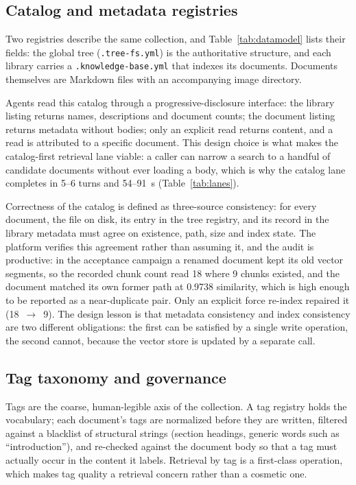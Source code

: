 \subsection{Catalog and metadata registries}
\label{sec:org-registries}

Two registries describe the same collection, and Table~\ref{tab:datamodel}
lists their fields: the global tree (\texttt{.tree-fs.yml}) is the
authoritative structure, and each library carries a
\texttt{.knowledge-base.yml} that indexes its documents. Documents themselves
are Markdown files with an accompanying image directory.

Agents read this catalog through a progressive-disclosure interface: the
library listing returns names, descriptions and document counts; the
document listing returns metadata without bodies; only an explicit read
returns content, and a read is attributed to a specific document. This design
choice is what makes the catalog-first retrieval lane viable: a caller can
narrow a search to a handful of candidate documents without ever loading a
body, which is why the catalog lane completes in 5--6 turns and 54--91~s
(Table~\ref{tab:lanes}).

Correctness of the catalog is defined as three-source consistency: for every
document, the file on disk, its entry in the tree registry, and its record in
the library metadata must agree on existence, path, size and index state. The
platform verifies this agreement rather than assuming it, and the audit is
productive: in the acceptance campaign a renamed document kept its old vector
segments, so the recorded chunk count read 18 where 9 chunks existed, and the
document matched its own former path at 0.9738 similarity, which is high
enough to be reported as a near-duplicate pair. Only an explicit force
re-index repaired it (18~$\rightarrow$~9). The design lesson is that metadata
consistency and index consistency are two different obligations: the first
can be satisfied by a single write operation, the second cannot, because the
vector store is updated by a separate call.

\subsection{Tag taxonomy and governance}
\label{sec:org-tags}

Tags are the coarse, human-legible axis of the collection. A tag registry
holds the vocabulary; each document's tags are normalized before they are
written, filtered against a blacklist of structural strings (section
headings, generic words such as ``introduction''), and re-checked against the
document body so that a tag must actually occur in the content it labels.
Retrieval by tag is a first-class operation, which makes tag quality a
retrieval concern rather than a cosmetic one.


